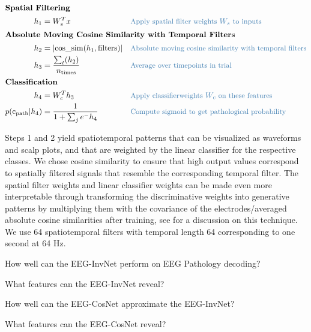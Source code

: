\begin{align*}
    \intertext{\textbf{Spatial Filtering}}
    h_1 &= W_s^Tx && \codecomment{\text{Apply spatial filter weights } W_s \text{ to  inputs }} \\
    \intertext{\textbf{Absolute Moving Cosine Similarity with Temporal Filters}}
    h_2 &= |\mathrm{cos\_sim}(h_1, \mathrm{filters})| && \codecomment{\text{Absolute moving cosine similarity with temporal filters}} \\
    h_3 &=\frac{\sum_t (h_2)}{n_\mathrm{times}} && \codecomment{\text{Average over timepoints in trial}} \\
    \intertext{\textbf{Classification}}
    h_4 &= W_c^Th_3 && \codecomment{\text{Apply classifierweights } W_c \text{ on these features }} \\
p(\mathrm{c_\mathrm{path}}|h_4) &= \frac{1}{1 + \sum_j e^-h_{4}} && \codecomment{\text{Compute sigmoid to get pathological probability}} \\
\end{align*}

Steps 1 and 2 yield spatiotemporal patterns that can be visualized as
waveforms and scalp plots, and that are weighted by the linear
classifier for the respective classes. We chose cosine similarity to
ensure that high output values correspond to spatially filtered signals
that resemble the corresponding temporal filter. The spatial filter
weights and linear classifier weights can be made even more
interpretable through transforming the discriminative weights into
generative patterns by multiplying them with the covariance of the
electrodes/averaged absolute cosine similarities after training, see
\citet{haufe_interpretation_2014} for a discussion on this
technique. We use 64 spatiotemporal filters with temporal length 64
corresponding to one second at 64 Hz.


\begin{openbox}
\item How well can the EEG-InvNet perform on EEG Pathology decoding?
\item What features can the EEG-InvNet reveal?
\item How well can the EEG-CosNet approximate the EEG-InvNet?
\item What features can the EEG-CosNet reveal?
\end{openbox}

